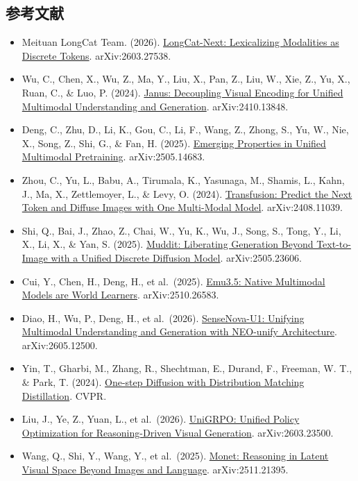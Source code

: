 \hypertarget{ux53c2ux8003ux6587ux732e-194}{%
\subsection{参考文献}\label{ux53c2ux8003ux6587ux732e-194}}

\begin{itemize}
\tightlist
\item
  Meituan LongCat Team. (2026). \href{https://arxiv.org/abs/2603.27538}{LongCat-Next: Lexicalizing Modalities as Discrete Tokens}. arXiv:2603.27538.
\item
  Wu, C., Chen, X., Wu, Z., Ma, Y., Liu, X., Pan, Z., Liu, W., Xie, Z., Yu, X., Ruan, C., \& Luo, P. (2024). \href{https://arxiv.org/abs/2410.13848}{Janus: Decoupling Visual Encoding for Unified Multimodal Understanding and Generation}. arXiv:2410.13848.
\item
  Deng, C., Zhu, D., Li, K., Gou, C., Li, F., Wang, Z., Zhong, S., Yu, W., Nie, X., Song, Z., Shi, G., \& Fan, H. (2025). \href{https://arxiv.org/abs/2505.14683}{Emerging Properties in Unified Multimodal Pretraining}. arXiv:2505.14683.
\item
  Zhou, C., Yu, L., Babu, A., Tirumala, K., Yasunaga, M., Shamis, L., Kahn, J., Ma, X., Zettlemoyer, L., \& Levy, O. (2024). \href{https://arxiv.org/abs/2408.11039}{Transfusion: Predict the Next Token and Diffuse Images with One Multi-Modal Model}. arXiv:2408.11039.
\item
  Shi, Q., Bai, J., Zhao, Z., Chai, W., Yu, K., Wu, J., Song, S., Tong, Y., Li, X., Li, X., \& Yan, S. (2025). \href{https://arxiv.org/abs/2505.23606}{Muddit: Liberating Generation Beyond Text-to-Image with a Unified Discrete Diffusion Model}. arXiv:2505.23606.
\item
  Cui, Y., Chen, H., Deng, H., et al.~(2025). \href{https://arxiv.org/abs/2510.26583}{Emu3.5: Native Multimodal Models are World Learners}. arXiv:2510.26583.
\item
  Diao, H., Wu, P., Deng, H., et al.~(2026). \href{https://arxiv.org/abs/2605.12500}{SenseNova-U1: Unifying Multimodal Understanding and Generation with NEO-unify Architecture}. arXiv:2605.12500.
\item
  Yin, T., Gharbi, M., Zhang, R., Shechtman, E., Durand, F., Freeman, W. T., \& Park, T. (2024). \href{https://arxiv.org/abs/2311.18828}{One-step Diffusion with Distribution Matching Distillation}. CVPR.
\item
  Liu, J., Ye, Z., Yuan, L., et al.~(2026). \href{https://arxiv.org/abs/2603.23500}{UniGRPO: Unified Policy Optimization for Reasoning-Driven Visual Generation}. arXiv:2603.23500.
\item
  Wang, Q., Shi, Y., Wang, Y., et al.~(2025). \href{https://arxiv.org/abs/2511.21395}{Monet: Reasoning in Latent Visual Space Beyond Images and Language}. arXiv:2511.21395.
\end{itemize}

